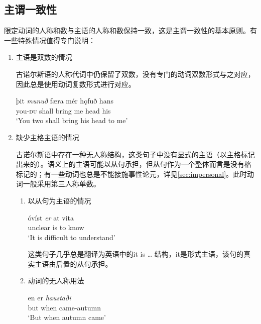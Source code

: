 \subsection{主谓一致性}
\label{sec:SVagreement}
限定动词的人称和数与主语的人称和数保持一致，这是主谓一致性的基本原则。有一些特殊情况值得专门说明：
\begin{enumerate}
    \setlength{\parindent}{2em}
    \item 主语是双数的情况

          古诺尔斯语的人称代词中仍保留了双数，没有专门的动词双数形式与之对应，因此总是使用动词复数形式进行对应。
          \begin{exe}
              \ex
              \gll þit	\textit{munuð}	færa	mér	hǫfuð	hans\\
              you-\textsc{du}	shall	bring	me	head	his\\
              \trans `You two shall bring his head to me’
          \end{exe}

    \item 缺少主格主语的情况

          古诺尔斯语中存在一种无人称结构，这类句子中没有显式的主语（以主格标记出来的）。语义上的主语可能以从句承担，但从句作为一个整体而言是没有格标记的；有一些动词也总是不能接施事性论元，详见\ref{sec:impersonal}。此时动词一般采用第三人称单数。
          \begin{enumerate}
              \setlength{\parindent}{2em}
              \item 以从句为主语的情况
                    \begin{exe}
                        \ex
                        \gll óvíst	\textit{er}	at	vita\\
                        unclear	is	to	know\\
                        \trans `It is difficult to understand’
                    \end{exe}
                    这类句子几乎总是翻译为英语中的it is … 结构，it是形式主语，该句的真实主语由后置的从句承担。
              \item 动词的无人称用法
                    \begin{exe}
                        \ex
                        \gll en	er	\textit{haustaði}\\
                        but	when	came-autumn\\
                        \trans `But when autumn came’
                    \end{exe}


\end{enumerate}
\end{enumerate}

